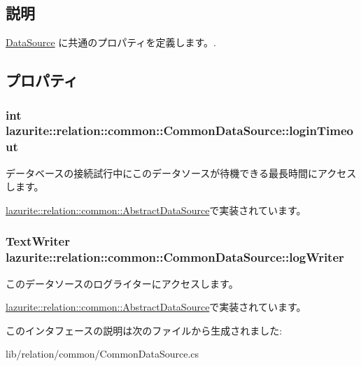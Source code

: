 \subsection{説明}
\hyperlink{interfacelazurite_1_1relation_1_1common_1_1_data_source}{DataSource} に共通のプロパティを定義します。. 

\subsection{プロパティ}
\hypertarget{interfacelazurite_1_1relation_1_1common_1_1_common_data_source_a3fa02340190e1fed4b3cc28d87ce6908}{
\subsubsection[{loginTimeout}]{\setlength{\rightskip}{0pt plus 5cm}int lazurite::relation::common::CommonDataSource::loginTimeout}}
\label{interfacelazurite_1_1relation_1_1common_1_1_common_data_source_a3fa02340190e1fed4b3cc28d87ce6908}


データベースの接続試行中にこのデータソースが待機できる最長時間にアクセスします。 

\hyperlink{classlazurite_1_1relation_1_1common_1_1_abstract_data_source_a95357e4aa2578c81c55805ef877f6694}{lazurite::relation::common::AbstractDataSource}で実装されています。\hypertarget{interfacelazurite_1_1relation_1_1common_1_1_common_data_source_a727c10810a495b3264cd6bda3417522e}{
\subsubsection[{logWriter}]{\setlength{\rightskip}{0pt plus 5cm}TextWriter lazurite::relation::common::CommonDataSource::logWriter}}
\label{interfacelazurite_1_1relation_1_1common_1_1_common_data_source_a727c10810a495b3264cd6bda3417522e}


このデータソースのログライターにアクセスします。 

\hyperlink{classlazurite_1_1relation_1_1common_1_1_abstract_data_source_ac0df2dbaf0813abab29a34aad40a7e12}{lazurite::relation::common::AbstractDataSource}で実装されています。

このインタフェースの説明は次のファイルから生成されました:\begin{DoxyCompactItemize}
\item 
lib/relation/common/CommonDataSource.cs\end{DoxyCompactItemize}
